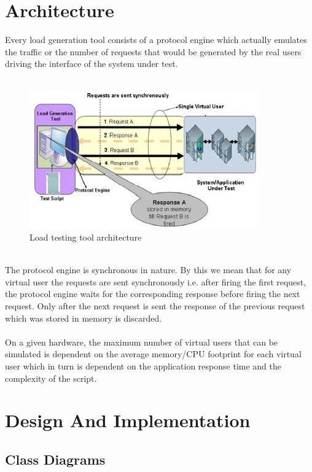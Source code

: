 \documentclass[12pt]{book}
\begin{document}
\chapter{Architecture}
Every load generation tool consists of a protocol engine which actually emulates
the traffic or the number of requests that would be generated by the real users driving the 
interface of the system under test.\\
\\
\begin{figure}[hb]
 \centering
 \includegraphics{images/architecture}
 \caption{Load testing tool architecture\label{fig:fig1_JMeter}}
\end{figure}\\
The protocol engine is synchronous in nature. By this we mean that for any virtual user
the requests are sent synchronously i.e. after firing the first request,  the protocol engine
waits for the corresponding response before firing the next request. Only after the next request is 
sent the response of the previous request which was stored in memory is discarded.\\
\\
On a given hardware, the maximum number of virtual users that can be simulated
is dependent on the average memory/CPU footprint for each virtual user which in turn
is dependent on the application response time and the complexity of the script.

\chapter{Design And Implementation}
 \section{Class Diagrams}
\end{document}

